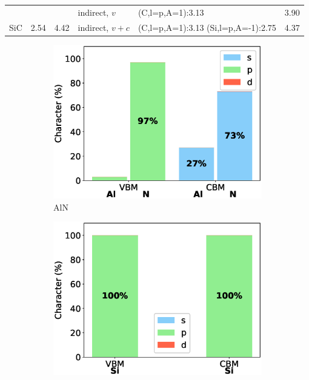 \begin{table}[h]
\begin{tabular}{c c c l p{3.5cm} c}
        & & &  indirect, $v$  & (C,l=p,A=1):3.13& 3.90  \\
        \multirow{-2}{*}{SiC} & \multirow{-2}{*}{2.54} & \multirow{-2}{*}{4.42} &  indirect, $v+c$ & (C,l=p,A=1):3.13 (Si,l=p,A=-1):2.75 & 4.37  \\
        \hline
        \hline
    \end{tabular}
    
\end{table}


\begin{figure}[!ht]
        \centering %
\begin{subfigure}{0.3\textwidth}
  \includegraphics[width=\linewidth]{images/aln_3d_composition.eps}
  \caption{AlN}
\end{subfigure}\hfil %
\begin{subfigure}{0.3\textwidth}
  \includegraphics[width=\linewidth]{images/si_3d_composition.eps}

\end{subfigure}
\end{figure}
